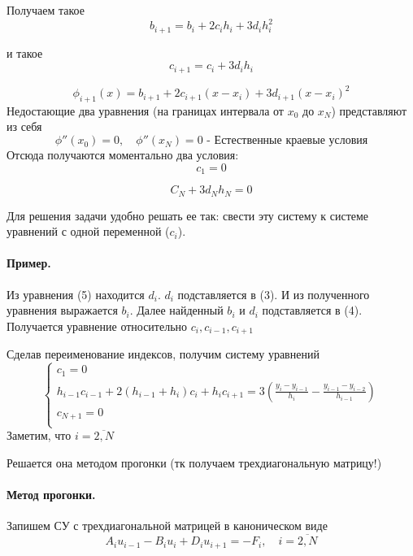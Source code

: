 Получаем такое
\begin{equation}
    b_{i+1} = b_{i} + 2c_ih_i + 3d_ih_i^2
\end{equation}

и такое
\begin{equation}
    c_{i+1} = c_i + 3d_{i}h_i
\end{equation}

\[
\phi_{i+1}(x) = b_{i+1} + 2c_{i+1}(x-x_{i}) + 3d_{i+1}(x-x_{i})^2
\] 
Недостающие два уравнения (на границах интервала от $x_0$ до $x_{N}$) представляют из себя
\[
    \phi''(x_0) = 0, \quad \phi''(x_{N})= 0\text{ - Естественные краевые условия}
\] 
Отсюда получаются моментально два условия:
\begin{equation}
    c_1 = 0
\end{equation}

\begin{equation}
    C_{N} + 3d_{N}h_{N} = 0
\end{equation}

\medskip

Для решения задачи удобно решать ее так: свести эту систему к системе уравнений с
одной переменной ($c_{i}$).

\paragraph*{Пример.}
Из уравнения (5) находится $d_i$.  $d_i$ подставляется в (3). И из полученного уравнения
выражается  $b_i$. Далее найденный  $b_i$ и  $d_i$ подставляется в (4). Получается уравнение
относительно  $c_{i}, c_{i-1}, c_{i+1}$ 

Сделав переименование индексов, получим систему уравнений
\[
    \begin{cases}
    c_1 = 0\\
    h_{i-1}c_{i-1} + 2(h_{i-1} + h_i)c_i + h_ic_{i+1} =
    3\left( \frac{y_{i} - y_{i-1}}{h_i} - \frac{y_{i-1} - y_{i-2}}{h_{i-1}} \right) \\
    c_{N+1} = 0\\
    \end{cases}
\]
Заметим, что $i = \overline{2,N}$ 

\medskip

Решается она методом прогонки (тк получаем трехдиагональную матрицу!)

\paragraph*{Метод прогонки.}
Запишем СУ с трехдиагональной матрицей в каноническом виде
\[
A_iu_{i-1} - B_iu_i + D_iu_{i+1} = -F_i,\quad i = \overline{2,N}
\]

